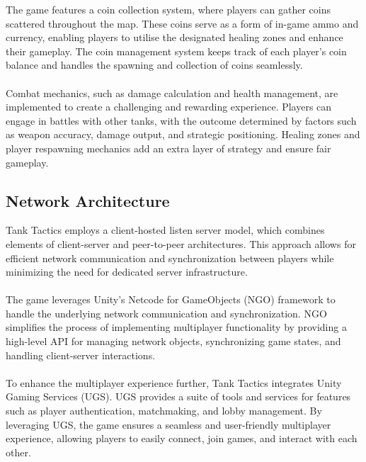 \noindent The game features a coin collection system, where players can gather coins scattered throughout the map. These coins serve as a form of in-game ammo and currency, enabling players to utilise the designated healing zones and enhance their gameplay. The coin management system keeps track of each player's coin balance and handles the spawning and collection of coins seamlessly.
\\
\noindent
\\
Combat mechanics, such as damage calculation and health management, are implemented to create a challenging and rewarding experience. Players can engage in battles with other tanks, with the outcome determined by factors such as weapon accuracy, damage output, and strategic positioning. Healing zones and player respawning mechanics add an extra layer of strategy and ensure fair gameplay.

\subsection{Network Architecture}
Tank Tactics employs a client-hosted listen server model, which combines elements of client-server and peer-to-peer architectures. This approach allows for efficient network communication and synchronization between players while minimizing the need for dedicated server infrastructure.
\\
\noindent
\\
The game leverages Unity's Netcode for GameObjects (NGO) framework to handle the underlying network communication and synchronization. NGO simplifies the process of implementing multiplayer functionality by providing a high-level API for managing network objects, synchronizing game states, and handling client-server interactions.
\\
\noindent
\\
To enhance the multiplayer experience further, Tank Tactics integrates Unity Gaming Services (UGS). UGS provides a suite of tools and services for features such as player authentication, matchmaking, and lobby management. By leveraging UGS, the game ensures a seamless and user-friendly multiplayer experience, allowing players to easily connect, join games, and interact with each other.
\\

